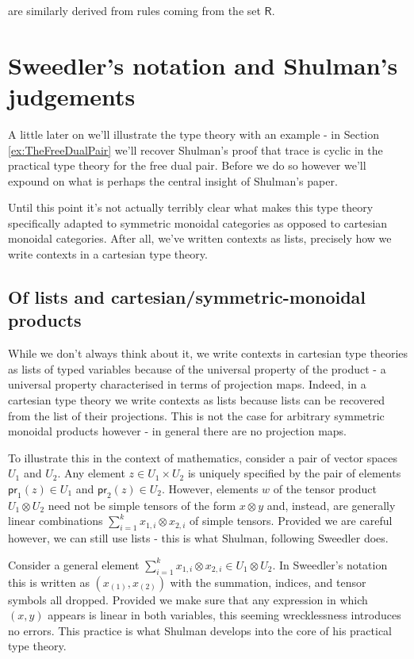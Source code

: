 \documentclass[pra,floatfix,
amsmath,superscriptaddress, 12pt]{article}
\theoremstyle{definition}
\newcommand{\msf}[1]{\mathsf{#1}}
\begin{document}
are similarly derived from rules coming from the set $\msf{R}$. 

\section{Sweedler's notation and Shulman's judgements}

A little later on we'll illustrate the type theory with an example - in Section \ref{ex:TheFreeDualPair} we'll recover Shulman's proof that trace is cyclic in the practical type theory for the free dual pair. Before we do so however we'll expound on what is perhaps the central insight of Shulman's paper.

Until this point it's not actually terribly clear what makes this type theory specifically adapted to symmetric monoidal categories as opposed to cartesian monoidal categories. After all, we've written contexts as lists, precisely how we write contexts in a cartesian type theory. 

\subsection{Of lists and cartesian/symmetric-monoidal products}

While we don't always think about it, we write contexts in cartesian type theories as lists of typed variables because of the universal property of the product - a universal property characterised in terms of projection maps. Indeed, in a cartesian type theory we write contexts as lists because lists can be recovered from the list of their projections. This is not the case for arbitrary symmetric monoidal products however - in general there are no projection maps.

To illustrate this in the context of mathematics, consider a pair of vector spaces $U_1$ and $U_2$. Any element  $z\in U_1 \times U_2$ is uniquely specified by the pair of elements $\msf{pr}_{1}(z) \in U_1$ and $\msf{pr}_{2}(z)\in U_2$. However, elements $w$ of the tensor product $U_1 \otimes U_2$ need not be simple tensors of the form $x \otimes y$ and, instead, are generally linear combinations $\sum_{i=1}^{k}x_{1,i} \otimes x_{2,i}$ of simple tensors. Provided we are careful however, we can still use lists - this is what Shulman, following Sweedler does.

Consider a general element $\sum_{i=1}^{k}x_{1,i}\otimes x_{2,i} \in U_1 \otimes U_2$. In Sweedler's notation this is written as $(x_{(1)}, x_{(2)})$ with the summation, indices, and tensor symbols all dropped. Provided we make sure that any expression in which $(x,y)$ appears is linear in both variables, this seeming wrecklessness introduces no errors. This practice is what Shulman develops into the core of his practical type theory.
\end{document}
